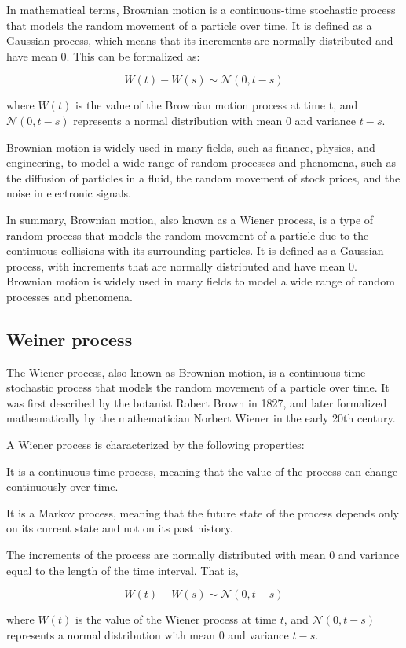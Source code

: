 \documentclass[12pt, a4paper, oneside]{article}
\begin{document}
In mathematical terms, Brownian motion is a continuous-time stochastic process that models the random movement of a particle over time. It is defined as a Gaussian process, which means that its increments are normally distributed and have mean 0. This can be formalized as:

$$ W(t) - W(s) \sim \mathcal{N}(0,t-s) $$

where $W(t)$ is the value of the Brownian motion process at time t, and $\mathcal{N}(0,t-s)$ represents a normal distribution with mean 0 and variance $t-s$.

Brownian motion is widely used in many fields, such as finance, physics, and engineering, to model a wide range of random processes and phenomena, such as the diffusion of particles in a fluid, the random movement of stock prices, and the noise in electronic signals.

In summary, Brownian motion, also known as a Wiener process, is a type of random process that models the random movement of a particle due to the continuous collisions with its surrounding particles. It is defined as a Gaussian process, with increments that are normally distributed and have mean 0. Brownian motion is widely used in many fields to model a wide range of random processes and phenomena.
\subsection{ Weiner process }
The Wiener process, also known as Brownian motion, is a continuous-time stochastic process that models the random movement of a particle over time. It was first described by the botanist Robert Brown in 1827, and later formalized mathematically by the mathematician Norbert Wiener in the early 20th century.

A Wiener process is characterized by the following properties:

It is a continuous-time process, meaning that the value of the process can change continuously over time.

It is a Markov process, meaning that the future state of the process depends only on its current state and not on its past history.

The increments of the process are normally distributed with mean 0 and variance equal to the length of the time interval. That is,

$$ W(t) - W(s) \sim \mathcal{N}(0,t-s) $$

where $W(t)$ is the value of the Wiener process at time $t$, and $\mathcal{N}(0,t-s)$ represents a normal distribution with mean 0 and variance $t-s$.
\end{document}
